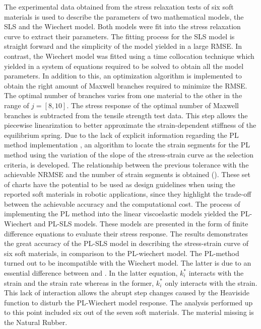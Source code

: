 The experimental data obtained from the stress relaxation tests of six soft materials is used to describe the parameters of two mathematical models, the SLS and the Wiechert model. Both models were fit into the stress relaxation curve to extract their parameters. The fitting process for the SLS model is straight forward and the simplicity of the model yielded in a large RMSE. In contrast, the Wiechert model was fitted using a time collocation technique which yielded in a system of equations required to be solved to obtain all the model parameters. In addition to this, an optimization algorithm is implemented to obtain the right amount of Maxwell branches required to minimize the RMSE. The optimal number of branches varies from one material to the other in the range of $j=[8,10]$. The stress response of the optimal number of Maxwell branches is subtracted from the tensile strength test data. This step allows the piecewise linearization to better approximate the strain-dependent stiffness of the equilibrium spring. Due to the lack of explicit information regarding the PL method implementation \cite{austin2015control}, an algorithm to locate the strain segments for the PL method using the variation of the slope of the stress-strain curve as the selection criteria, is developed. The relationship between the previous tolerance with the achievable NRMSE and the number of strain segments is obtained (). These set of charts have the potential to be used as design guidelines when using the reported soft materials in robotic applications, since they highlight the trade-off between the achievable accuracy and the computational cost. The process of implementing the PL method into the linear viscoelastic models yielded the PL-Wiechert and PL-SLS models. These models are presented in the form of finite difference equations to evaluate their stress response. The results demonstrates the great accuracy of the PL-SLS model in describing the stress-strain curve of six soft materials, in comparison to the PL-wiechert model. The PL-method turned out to be incompatible with the Wiechert model. The latter is due to an essential difference between  and . In the latter equation, $k_i^*$ interacts with the strain and the strain rate whereas in the former, $k_i^*$ only interacts with the strain. This lack of interaction allows the abrupt step changes caused by the Heaviside function to disturb the PL-Wiechert model response. The analysis performed up to this point included six out of the seven soft materials. The material missing is the Natural Rubber.

